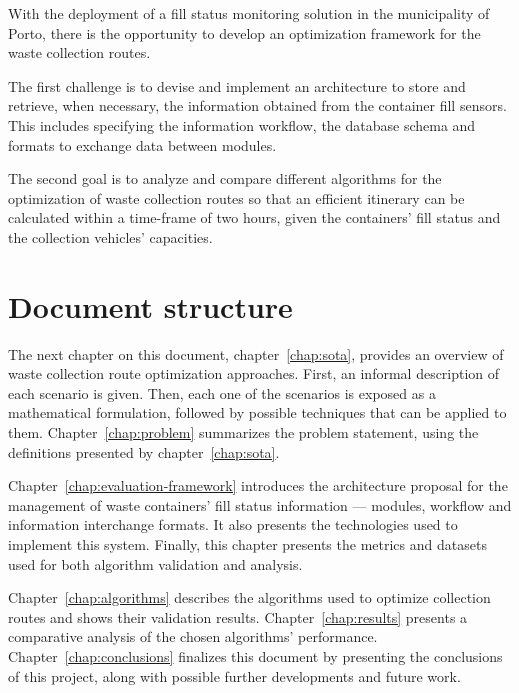 With the deployment of a fill status monitoring solution in the municipality of
Porto, there is the opportunity to develop an optimization framework for the
waste collection routes.

The first challenge is to devise and implement an architecture to store and
retrieve, when necessary, the information obtained from the container fill
sensors. This includes specifying the information workflow, the database schema
and formats to exchange data between modules.

The second goal is to analyze and compare different algorithms for the
optimization of waste collection routes so that an efficient itinerary can be
calculated within a time-frame of two hours, given the containers' fill status
and the collection vehicles' capacities.

\newpage
\section{Document structure}

The next chapter on this document, chapter~\ref{chap:sota}, provides an
overview of waste collection route optimization approaches. First, an informal
description of each scenario is given. Then, each one of the scenarios is
exposed as a mathematical formulation, followed by possible techniques that can
be applied to them. Chapter~\ref{chap:problem} summarizes the problem statement,
using the definitions presented by chapter~\ref{chap:sota}.

Chapter~\ref{chap:evaluation-framework} introduces the architecture proposal for
the management of waste containers' fill status information --- modules,
workflow and information interchange formats. It also presents the technologies
used to implement this system. Finally, this chapter presents the metrics and
datasets used for both algorithm validation and analysis.

Chapter~\ref{chap:algorithms} describes the algorithms used to optimize
collection routes and shows their validation results.
Chapter~\ref{chap:results} presents a comparative analysis of the chosen
algorithms' performance. Chapter~\ref{chap:conclusions} finalizes this document
by presenting the conclusions of this project, along with possible further
developments and future work.


